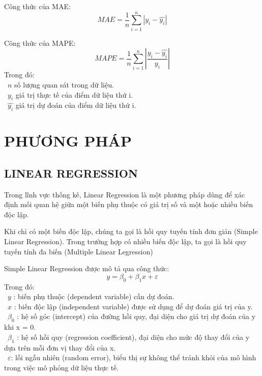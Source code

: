 \documentclass[conference]{IEEEtran}
\begin{document}
Công thức của MAE:
\[MAE=\frac{1}{n}  \sum_{i=1}^{n} |y_i-\hat{y_i} |\]

Công thức của MAPE:
\[MAPE=\frac{1}{n}  \sum_{i=1}^{n} |\frac{y_i-\hat{y_i}}{y_i}|\]
Trong đó:\\
	\indent\textbullet\ \(n\) số lượng quan sát trong dữ liệu.\\
	\indent\textbullet\ \(y_i\)  giá trị thực tế của điểm dữ liệu thứ i.\\
	\indent\textbullet\ \(\hat{y_i}\) giá trị dự đoán của điểm dữ liệu thứ i.

\section{PHƯƠNG PHÁP}
\subsection{LINEAR REGRESSION}
Trong lĩnh vực thống kê, Linear Regression là một phương pháp dùng để xác định mối quan hệ giữa một biến phụ thuộc có giá trị số và một hoặc nhiều biến độc lập.

Khi chỉ có một biến độc lập, chúng ta gọi là hồi quy tuyến tính đơn giản (Simple Linear Regression). Trong trường hợp có nhiều biến độc lập, ta gọi là hồi quy tuyến tính đa biến (Multiple Linear Legression)

Simple Linear Regression được mô tả qua công thức:
\[
 y = \beta_0 + \beta_1 x + \varepsilon
\]
Trong đó:\\
	\indent\textbullet\ \(y\) : biến phụ thuộc (dependent variable) cần dự đoán.\\
	\indent\textbullet\ \(x\) : biến độc lập (independent variable) được sử dụng để dự đoán giá trị của y.\\
        \indent\textbullet\ $\beta_0$ : hệ số góc (intercept) của đường hồi quy, đại diện cho giá trị dự đoán của y khi x = 0.\\
        \indent\textbullet\ $\beta_1$ : hệ số hồi quy (regression coefficient), đại diện cho mức độ thay đổi của y dựa trên mỗi đơn vị thay đổi của x.\\
        \indent\textbullet\ $\varepsilon$: lỗi ngẫu nhiên (random error), biểu thị sự không thể tránh khỏi của mô hình trong việc mô phỏng dữ liệu thực tế.
\end{document}
